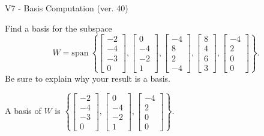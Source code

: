 \begin{exercise}
  \begin{exerciseTitle}V7 - Basis Computation (ver. 40)\end{exerciseTitle}
  \begin{exerciseStatement}
    Find a basis for the subspace 
\[W=\mathrm{span}\ \left\{\left[\begin{array}{r}
-2 \\
-4 \\
-3 \\
0
\end{array}\right] , \left[\begin{array}{r}
0 \\
-4 \\
-2 \\
1
\end{array}\right] , \left[\begin{array}{r}
-4 \\
8 \\
2 \\
-4
\end{array}\right] , \left[\begin{array}{r}
8 \\
4 \\
6 \\
3
\end{array}\right] , \left[\begin{array}{r}
-4 \\
2 \\
0 \\
0
\end{array}\right]\right\}.\]
 Be sure to explain why your result is a basis.


  \end{exerciseStatement}
  \begin{exerciseAnswer}
   A basis of \(W\) is  \(\left\{\left[\begin{array}{r}
-2 \\
-4 \\
-3 \\
0
\end{array}\right] , \left[\begin{array}{r}
0 \\
-4 \\
-2 \\
1
\end{array}\right] , \left[\begin{array}{r}
-4 \\
2 \\
0 \\
0
\end{array}\right]\right\}\).
  


  \end{exerciseAnswer}
\end{exercise}